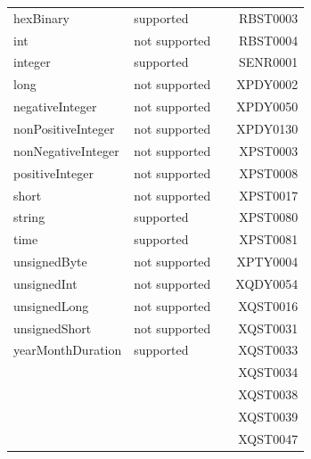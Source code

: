 \begin{table}[]
\begin{tabular}{lllr}
		hexBinary          & supported       &  & RBST0003                                           \\
		int                & not supported   &  & RBST0004                                           \\
		integer            & supported       &  & SENR0001                                           \\
		long               & not supported   &  & XPDY0002                                           \\
		negativeInteger    & not supported   &  & XPDY0050                                           \\
		nonPositiveInteger & not supported   &  & XPDY0130                                           \\
		nonNegativeInteger & not supported   &  & XPST0003                                           \\
		positiveInteger    & not supported   &  & XPST0008                                           \\
		short              & not supported   &  & XPST0017                                           \\
		string             & supported       &  & XPST0080                                           \\
		time               & supported       &  & XPST0081                                           \\
		unsignedByte       & not supported   &  & XPTY0004                                           \\
		unsignedInt        & not supported   &  & XQDY0054                                           \\
		unsignedLong       & not supported   &  & XQST0016                                           \\
		unsignedShort      & not supported   &  & XQST0031                                           \\
		yearMonthDuration  & supported       &  & XQST0033                                           \\
		&                 &  & XQST0034                                           \\
		&                 &  & XQST0038                                           \\
		&                 &  & XQST0039                                           \\
		&                 &  & XQST0047                                           \\

\end{tabular}
\end{table}
